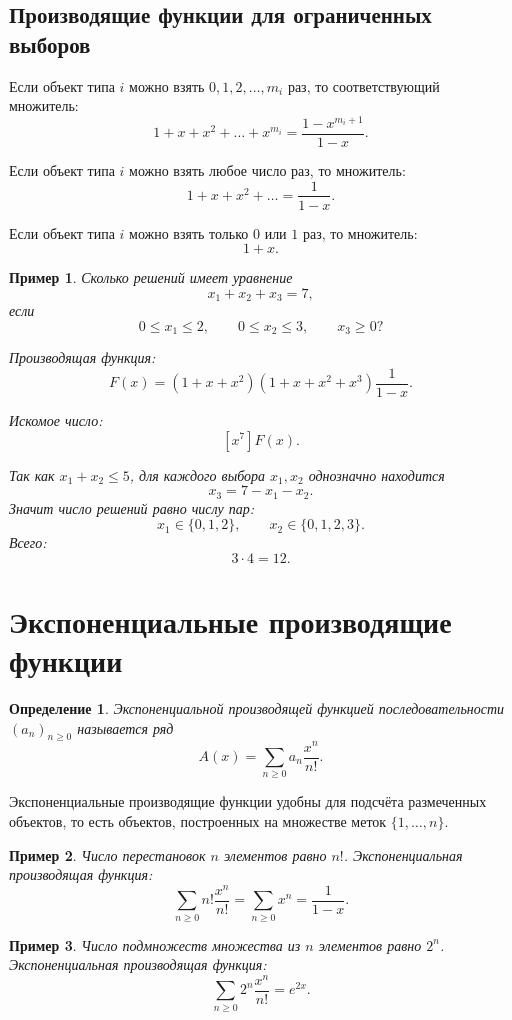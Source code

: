 \documentclass[12pt,a4paper]{article}
\newtheorem{definition}{Определение}
\newtheorem{example}{Пример}
\begin{document}
\subsection{Производящие функции для ограниченных выборов}

Если объект типа $i$ можно взять $0,1,2,\dots,m_i$ раз, то соответствующий множитель:
\[
1+x+x^2+\dots+x^{m_i}
=
\frac{1-x^{m_i+1}}{1-x}.
\]

Если объект типа $i$ можно взять любое число раз, то множитель:
\[
1+x+x^2+\dots=\frac{1}{1-x}.
\]

Если объект типа $i$ можно взять только $0$ или $1$ раз, то множитель:
\[
1+x.
\]

\begin{example}
Сколько решений имеет уравнение
\[
x_1+x_2+x_3=7,
\]
если
\[
0\le x_1\le 2,\qquad 0\le x_2\le 3,\qquad x_3\ge 0?
\]

Производящая функция:
\[
F(x)=(1+x+x^2)(1+x+x^2+x^3)\frac{1}{1-x}.
\]

Искомое число:
\[
[x^7]F(x).
\]

Так как $x_1+x_2\le 5$, для каждого выбора $x_1,x_2$ однозначно находится
\[
x_3=7-x_1-x_2.
\]
Значит число решений равно числу пар:
\[
x_1\in\{0,1,2\},\qquad x_2\in\{0,1,2,3\}.
\]
Всего:
\[
3\cdot 4=12.
\]
\end{example}

\section{Экспоненциальные производящие функции}

\begin{definition}
Экспоненциальной производящей функцией последовательности $(a_n)_{n\ge 0}$ называется ряд
\[
A(x)=\sum_{n\ge 0}a_n\frac{x^n}{n!}.
\]
\end{definition}

Экспоненциальные производящие функции удобны для подсчёта размеченных объектов, то есть объектов, построенных на множестве меток $\{1,\dots,n\}$.

\begin{example}
Число перестановок $n$ элементов равно $n!$. Экспоненциальная производящая функция:
\[
\sum_{n\ge 0}n!\frac{x^n}{n!}
=
\sum_{n\ge 0}x^n
=
\frac{1}{1-x}.
\]
\end{example}

\begin{example}
Число подмножеств множества из $n$ элементов равно $2^n$. Экспоненциальная производящая функция:
\[
\sum_{n\ge 0}2^n\frac{x^n}{n!}=e^{2x}.
\]
\end{example}
\end{document}
